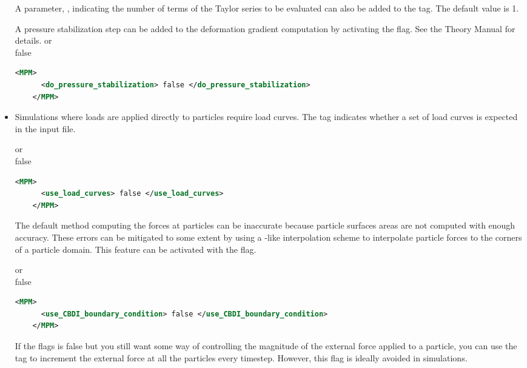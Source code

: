 \begin{itemize}
    A parameter, , indicating the number of terms of the Taylor 
    series to be evaluated can also be added to the tag.  The default value is 1.

    A pressure stabilization step can be added to the deformation gradient computation
    by activating the  flag.  See the \Vaango
    Theory Manual for details.
      or \\
     false
    \begin{lstlisting}[language=XML]
    <MPM>
      <do_pressure_stabilization> false </do_pressure_stabilization>
    </MPM>
    \end{lstlisting}
    
  \item {} Simulations where loads are applied directly to
    \MPM particles require load curves.  The  tag
    indicates whether a set of load curves is expected in the input file.
  
      or \\
     false
    \begin{lstlisting}[language=XML]
    <MPM>
      <use_load_curves> false </use_load_curves>
    </MPM>
    \end{lstlisting}

    The default method computing the forces at particles can be inaccurate because
    particle surfaces areas are not computed with enough accuracy.  These errors can be
    mitigated to some extent by using a \CPDI-like interpolation scheme to interpolate
    particle forces to the corners of a particle domain.  This feature can be
    activated with the  flag.

      or \\
     false
    \begin{lstlisting}[language=XML]
    <MPM>
      <use_CBDI_boundary_condition> false </use_CBDI_boundary_condition>
    </MPM>
    \end{lstlisting}

    If the  flags is false but you still want some way
    of controlling the magnitude of the external force applied to a particle,
    you can use the  tag to increment
    the external force at all the particles every timestep.  However, this flag
    is ideally avoided in simulations.


\end{itemize}
